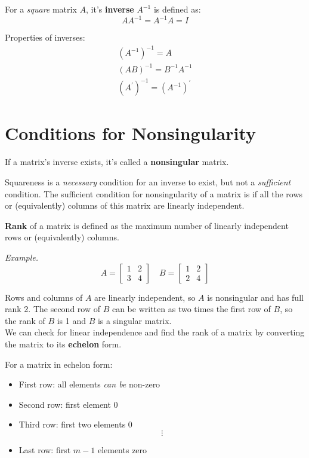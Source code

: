\documentclass{./../Latex/handout}
\begin{document}
For a \textit{square} matrix $A$, it's \textbf{inverse} $A^{-1}$ is defined as:
$$
A A^{-1}=A^{-1} A=I
$$

Properties of inverses:
$$
\begin{array}{l}
 \left(A^{-1}\right)^{-1}=A \\
 (A B)^{-1}=B^{-1} A^{-1}  \\
\left(A^{\prime}\right)^{-1}=\left(A^{-1}\right)^{\prime} 
\end{array}
$$


\section{Conditions for Nonsingularity}

 If a matrix's inverse exists, it's called a \textbf{nonsingular} matrix. 

 Squareness is a \textit{necessary} condition for an inverse to exist, but not a \textit{sufficient} condition. The sufficient condition for nonsingularity of a matrix is if all the rows or (equivalently) columns of this matrix are linearly independent. 

\textbf{Rank} of a matrix is defined as the maximum number of linearly independent rows or (equivalently) columns. 

\textit{Example.} $$A=\left[\begin{array}{ll}
1 & 2 \\
3 & 4
\end{array}\right]
\quad
B=\left[\begin{array}{ll}
1 & 2 \\
2 & 4
\end{array}\right]
$$

Rows and columns of $A$ are linearly independent, so $A$ is nonsingular and has full rank 2. The second row of $B$ can be written as two times the first row of $B$,  so the rank of $B$ is 1 and $B$ is a singular matrix.  \\

We can check for linear independence and find the rank of a matrix by converting the matrix to its \textbf{echelon} form. 

For a matrix in echelon form:
\begin{itemize}
\item First row: all elements \textit{can be} non-zero
\item Second row: first element $0$
\item Third row: first two elements $0$
$$\vdots$$
\item Last row: first $m-1$ elements zero \\
\end{itemize}
\end{document}
